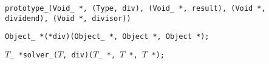 
\tt{prototype_(Void_ *, (Type, div), (Void_ *, result), (Void *, dividend), (Void *, divisor))}


\tt{Object_ *(*div)(Object_ *, Object *, Object *);}


$T$\tt{_ *solver_(}$T$\tt{, div)(}$T$\tt{_ *,} $T$ \tt{*,} $T$ \tt{*);}
